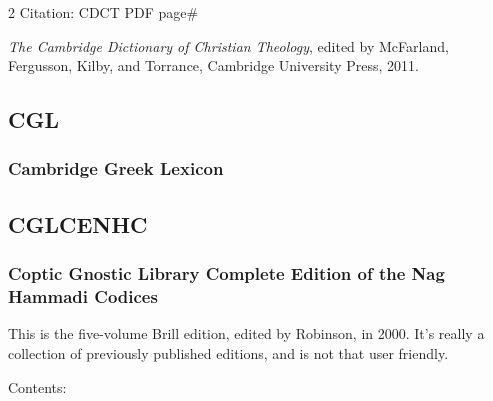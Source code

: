 \begin{multicols}{2}
			Citation:
				CDCT PDF page\#
				
			\textit{The Cambridge Dictionary of Christian Theology}, edited by McFarland, Fergusson, Kilby, and Torrance, Cambridge University Press, 2011.
			
	\subsection*{CGL}
	
		\subsubsection*{Cambridge Greek Lexicon}
		
			\phantom{.}
			
	\subsection*{CGLCENHC}
	
		\subsubsection*{Coptic Gnostic Library Complete Edition of the Nag Hammadi Codices}
		
			This is the five-volume Brill edition, edited by Robinson, in 2000. It's really a collection of previously published editions, and is not that user friendly.
			
			Contents:
			

\end{multicols}
